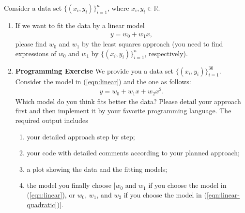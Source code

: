 \documentclass[11pt,letter,notitlepage]{article}
\begin{document}
\begin{exercise}
    Consider a data set $\{ (x_i ,y_i) \}_{i=1}^{n}$, where $x_i,y_i\in \mathbb{R}$.
    \begin{enumerate}
        \item If we want to fit the data by a linear model
              \begin{align}\label{eqn:linear}
                  y =  w_0 + w_1 x,
              \end{align}
              please find $w_0$ and $w_1$ by the least squares approach (you need to find expressions of $w_0$ and $w_1$ by $\{ (x_i ,y_i) \}_{i=1}^{n}$, respectively).
        \item \textbf{Programming Exercise} We provide you a data set $\{ (x_i ,y_i) \}_{i=1}^{30}$. Consider the model in (\ref{eqn:linear}) and the one as follows:
              \begin{align}\label{eqn:linear-quadratic}
                  y =  w_0 + w_1 x+ w_2 x^2.
              \end{align}
              Which model do you think fits better the data? Please detail your approach first and then implement it by your favorite programming language. The required output includes
              \begin{enumerate}
                  \item your detailed approach step by step;
                  \item your code with detailed comments according to your planned approach;
                  \item a plot showing the data and the fitting models;
                  \item the model you finally choose [$w_0$ and $w_1$ if you choose the model in (\ref{eqn:linear}), or $w_0$, $w_1$, and $w_2$ if you choose the model in (\ref{eqn:linear-quadratic})].
              \end{enumerate}
    \end{enumerate}

\end{exercise}
\end{document}
